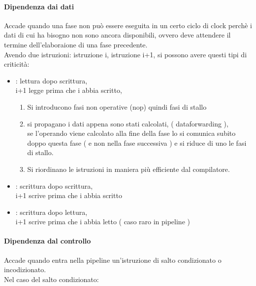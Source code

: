 \documentclass[arch.tex]{subfiles}
\begin{document}
\paragraph{Dipendenza dai dati}%
\label{par:dipendenza_dai_dati}
Accade quando una fase non può essere eseguita in un certo ciclo di clock 
perchè i dati di cui ha bisogno non sono ancora disponibili, ovvero deve attendere
il termine dell'elaboraione di una fase precedente.\\
Avendo due istruzioni: istruzione i, istruzione i+1, si possono 
avere questi tipi di criticità:

\begin{itemize}
	\item {}: lettura dopo scrittura,\\
		i+1 legge prima che i abbia scritto,\\
		\begin{enumerate}
		\item Si introducono fasi non operative (nop) quindi fasi di stallo
		\item si propagano i dati appena sono stati calcolati, 
			( dataforwarding ),\\
		se l'operando viene calcolato alla fine della fase  
		lo si comunica subito doppo questa fase ( e non nella fase successiva
		  )  e si riduce di uno le fasi di stallo.
		\item Si riordinano le istruzioni in maniera più efficiente dal compilatore.
		\end{enumerate}
	\item {}: scrittura dopo scrittura,\\
		i+1 scrive prima che i abbia scritto
	\item {}: scrittura dopo lettura,\\
		i+1 scrive prima che i abbia letto ( caso raro in pipeline )  
\end{itemize}

\paragraph{Dipendenza dal controllo}%
\label{par:dipendenza_dal_controllo}
Accade quando entra nella pipeline un'istruzione di salto condizionato o incodizionato.\\
Nel caso del salto condizionato:\\
\end{document}
